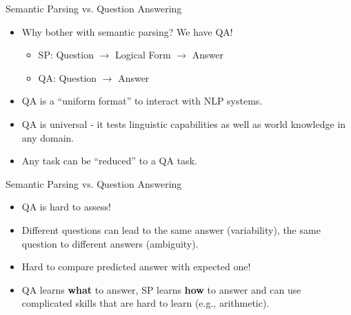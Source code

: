 \documentclass{beamer}
\begin{document}
\begin{frame}{Semantic Parsing vs. Question Answering}
    \begin{itemize}
        \item Why bother with semantic parsing? We have QA!

        \begin{itemize}
            \item SP: Question $\rightarrow$ Logical Form $\rightarrow$ Answer
            \item QA: Question $\rightarrow$ Answer
        \end{itemize}

        \pause

        \item QA is a ``uniform format'' to interact with NLP systems.
        
        \pause
        
        \item QA is universal - it tests linguistic capabilities as well as world knowledge in any domain.
        
        \pause
        
        \item Any task can be ``reduced'' to a QA task.
    \end{itemize}
\end{frame}

\begin{frame}{Semantic Parsing vs. Question Answering}
    \begin{itemize}
        \item QA is hard to assess!

        \pause

        \item Different questions can lead to the same answer (variability), the same question to different answers (ambiguity).

        \pause

        \item Hard to compare predicted answer with expected one!

        \pause

        \item QA learns \textbf{what} to answer, SP learns \textbf{how} to answer and can use complicated skills that are hard to learn (e.g., arithmetic).
    \end{itemize}
\end{frame}
\end{document}
